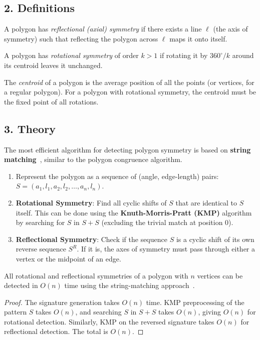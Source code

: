 \subsection{2. Definitions}
\begin{definition}
\label{def:ps_reflectional}
A polygon has \emph{reflectional (axial) symmetry} if there exists a line $\ell$ (the axis of symmetry) such that reflecting the polygon across $\ell$ maps it onto itself.
\end{definition}

\begin{definition}
\label{def:ps_rotational}
A polygon has \emph{rotational symmetry} of order $k > 1$ if rotating it by $360^\circ/k$ around its centroid leaves it unchanged.
\end{definition}

\begin{definition}
\label{def:ps_centroid}
The \emph{centroid} of a polygon is the average position of all the points (or vertices, for a regular polygon). For a polygon with rotational symmetry, the centroid must be the fixed point of all rotations.
\end{definition}

\subsection{3. Theory}
The most efficient algorithm for detecting polygon symmetry is based on \textbf{string matching}~\cite{atallah1985symmetry}, similar to the polygon congruence algorithm.
\begin{enumerate}
    \item Represent the polygon as a sequence of (angle, edge-length) pairs: $S = (a_1, l_1, a_2, l_2, \dots, a_n, l_n)$.
    \item \textbf{Rotational Symmetry}: Find all cyclic shifts of $S$ that are identical to $S$ itself. This can be done using the \textbf{Knuth-Morris-Pratt (KMP)} algorithm by searching for $S$ in $S+S$ (excluding the trivial match at position 0).
    \item \textbf{Reflectional Symmetry}: Check if the sequence $S$ is a cyclic shift of its own reverse sequence $S^R$. If it is, the axes of symmetry must pass through either a vertex or the midpoint of an edge.
\end{enumerate}

\begin{theorem}
\label{thm:ps_complexity}
All rotational and reflectional symmetries of a polygon with $n$ vertices can be detected in $O(n)$ time using the string-matching approach~\cite{highnam1986}.
\end{theorem}
\begin{proof}
The signature generation takes $O(n)$ time. KMP preprocessing of the pattern $S$ takes $O(n)$, and searching $S$ in $S+S$ takes $O(n)$, giving $O(n)$ for rotational detection. Similarly, KMP on the reversed signature takes $O(n)$ for reflectional detection. The total is $O(n)$.
\end{proof}

